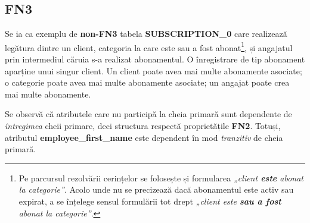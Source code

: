 \documentclass[a4paper, oneside, 12pt]{article}
\newcommand{\rowstyle}[1]{\gdef\currentrowstyle{#1}%
  #1\ignorespaces
}
\begin{document}
\begin{table}[H]
\centering
\caption*{Tabela \textbf{GROUP\_MEMBER\_2}:}
\end{table}

\subsection{FN3}

Se ia ca exemplu de \textbf{non-FN3} tabela \textbf{SUBSCRIPTION\_0} care
realizează legătura dintre un client, categoria la care este sau a fost
abonat\footnote{Pe parcursul rezolvării cerințelor se folosește și formularea
\emph{„client \textbf{este} abonat la categorie”}. Acolo unde nu se precizează dacă
abonamentul este activ sau expirat, a se înțelege sensul formulării tot drept \emph{„client este
\textbf{sau a fost} abonat la categorie”}.}, și angajatul prin intermediul
căruia s-a realizat abonamentul. O înregistrare de tip abonament aparține unui
singur client. Un client poate avea mai multe abonamente asociate; o categorie
poate avea mai multe abonamente asociate; un angajat poate crea mai multe
abonamente.


\begin{table}[H]
\centering
\caption*{Tabela \textbf{SUBSCRIPTION\_0}:}
\end{table}

Se observă că atributele care nu participă la cheia primară sunt dependente de
\emph{întregimea} cheii primare, deci structura respectă proprietățile \textbf{FN2}.
Totuși, atributul \textbf{employee\_first\_name} este dependent în mod
\emph{tranzitiv} de cheia primară.
\end{document}
